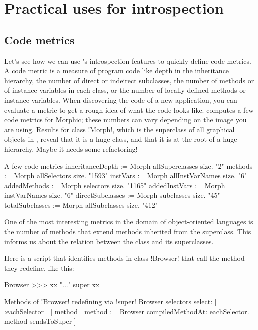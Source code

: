 \documentclass[a4paper,10pt,twoside]{book}
\begin{document}

\section{Practical uses for introspection} %

\subsection{Code metrics}

Let's see how we can use \st's introspection features to quickly define code metrics.
A code metric is a measure of program code like depth in the inheritance hierarchy, the number of direct or indeirect subclasses, the number of methods or of instance variables in each class, or the number of locally defined methods or instance variables.
When discovering the code of a new application, you can evaluate a metric to get a rough idea of what the code looks like.
 computes a few code metrics for Morphic; these numbers can vary depending on the image you are using.
Results for class \ct!Morph!, which is the superclass of all graphical objects in \squeak, reveal that it is a huge class, and that it is at the root of a huge hierarchy. Maybe it needs some refactoring!

\begin{script}[metrics]{A few code metrics}
	inheritanceDepth := Morph allSuperclasses size. "2"
	methods := Morph allSelectors size. "1593"
	instVars := Morph allInstVarNames size. "6"
	addedMethods := Morph selectors size. "1165"
	addedInstVars := Morph instVarNames size. "6"
	directSubclasses := Morph subclasses size. "45"
	totalSubclasses := Morph allSubclasses size. "412"
\end{script}

One of the most interesting metrics in the domain of object-oriented languages is the number of methods that extend methods inherited from the superclass.
This informs us about the relation between the class and its superclasses.

Here is a script that identifies methods in class \ct!Browser! that call the method they redefine, like this:
\begin{code}{}
Browser >>> xx
	"..."
	super xx
\end{code}

\begin{script}[browsersendstosuper]{Methods of \ct!Browser! redefining via \ct!super!}
Browser selectors select: [ :eachSelector |
	| method |
	method := Browser compiledMethodAt: eachSelector.
	method sendsToSuper ]
\end{script}
\end{document}
